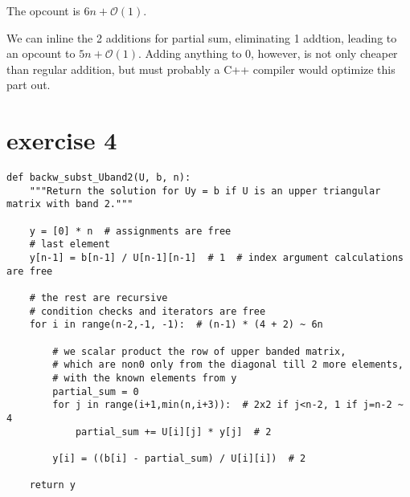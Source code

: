 \documentclass{article}
\begin{document}
The opcount is $6n + \mathcal{O}(1)$.

We can inline the 2 additions for partial sum,
eliminating 1 addtion,
leading to an opcount to $5n + \mathcal O (1)$. Adding anything to 0, however,
is not only cheaper than regular addition,
but must probably a C++ compiler would optimize this part out.

\section{exercise 4}

\begin{verbatim}
def backw_subst_Uband2(U, b, n):
    """Return the solution for Uy = b if U is an upper triangular matrix with band 2."""

    y = [0] * n  # assignments are free
    # last element
    y[n-1] = b[n-1] / U[n-1][n-1]  # 1  # index argument calculations are free

    # the rest are recursive
    # condition checks and iterators are free
    for i in range(n-2,-1, -1):  # (n-1) * (4 + 2) ~ 6n

        # we scalar product the row of upper banded matrix,
        # which are non0 only from the diagonal till 2 more elements,
        # with the known elements from y
        partial_sum = 0
        for j in range(i+1,min(n,i+3)):  # 2x2 if j<n-2, 1 if j=n-2 ~ 4
            partial_sum += U[i][j] * y[j]  # 2

        y[i] = ((b[i] - partial_sum) / U[i][i])  # 2

    return y
\end{verbatim}
\end{document}
